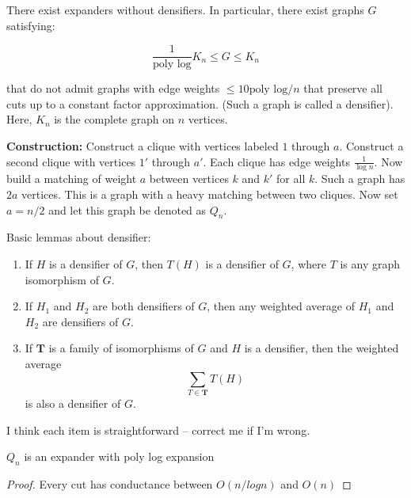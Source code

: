 There exist expanders without densifiers. In particular, there
exist graphs $G$ satisfying:

\[ \frac{1}{\text{poly log}} K_n \leq G \leq K_n \]

that do not admit graphs with edge weights $ \leq 10 \text{poly
log} /n$ that preserve all cuts up to a constant factor
approximation. (Such a graph is called a densifier). Here, $K_n$
is the complete graph on $n$ vertices.

\textbf{Construction:}
Construct a clique with vertices labeled $1$ through $a$. Construct a
second clique with vertices $1'$ through $a'$. Each clique has
edge weights $\frac{1}{\log n}$. Now build a matching of weight
$a$ between vertices $k$ and $k'$ for all $k$. Such a graph has
$2a$ vertices. This is a graph with a heavy matching between two
cliques. Now set $a = n/2$ and let this graph be denoted as
$Q_n$.

Basic lemmas about densifier:
\begin{lemma} 
  \begin{enumerate}
    \item If $H$ is a densifier of $G$, then $T(H)$ is a
      densifier of $G$, where $T$ is any graph isomorphism of
      $G$.
    \item If $H_1$ and $H_2$ are both densifiers of $G$, then
      any weighted average of $H_1$ and $H_2$ are densifiers of
      $G$.
    \item If $\textbf{T}$ is a family of isomorphisms of $G$ and
      $H$ is a densifier, then the weighted average 
      \[ \sum_{T \in \textbf{T}} T(H) \] is also a densifier of
      $G$.
  \end{enumerate}
\end{lemma}
I think each item is straightforward -- correct me if I'm wrong.

\begin{theorem} $Q_n$ is an expander with poly log expansion \end{theorem}
  \begin{proof} Every cut has conductance between $O(n / log n)$
    and $O(n)$
  \end{proof}

